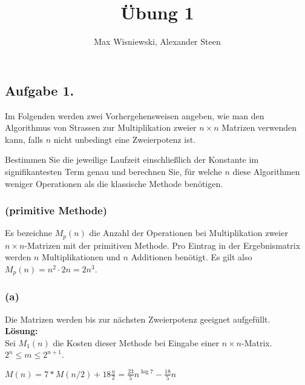 \documentclass[11pt,a4paper,ngerman]{article}
\date{}
\title{Übung 1}
\author{Max Wisniewski, Alexander Steen}
\begin{document}

\renewcommand{\figurename}{Figure}

\maketitle
\thispagestyle{fancy}

\subsection*{Aufgabe 1.}

Im Folgenden werden zwei Vorhergehensweisen angeben, wie man den Algorithmus
von Strassen zur Multiplikation zweier $n \times n$ Matrizen verwenden kann, falls
$n$ nicht unbedingt eine Zweierpotenz ist.

Bestimmen Sie die jeweilige Laufzeit einschließlich der Konstante im signifikantesten
Term genau und berechnen Sie, für welche $n$ diese Algorithmen weniger Operationen als
die klassische Methode benötigen.

\subsubsection*{(primitive Methode)}
Es bezeichne $M_p(n)$ die Anzahl der Operationen bei Multiplikation zweier $n \times n$-Matrizen
mit der primitiven Methode. Pro Eintrag in der Ergebnismatrix werden $n$ Multiplikationen
und $n$ Additionen benötigt. Es gilt also $M_p(n) = n^2 \cdot 2n = 2n^3$.

\subsubsection*{(a)}

Die Matrizen werden bis zur nächsten Zweierpotenz geeignet aufgefüllt.\\

\textbf{Lösung:}\\
Sei $M_1(n)$ die Kosten dieser Methode bei Eingabe einer $n \times n$-Matrix.
 $2^n \leq m \leq 2^{n+1}$.


$M(n) = 7*M(n/2) + 18 \frac{n}{2} = \frac{23}{5}n^{\log 7} - \frac{18}{5}n$
\end{document}
